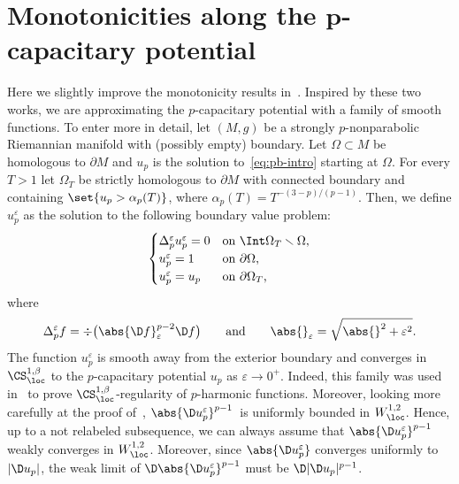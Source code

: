 \documentclass[10pt,a4paper]{amsart}
\numberwithin{equation}{section}
\newcounter{case}
\begin{document}
\appendix


\section[Monotonicities along the p-capacitary potential]{Monotonicities along the $\boldsymbol{p}$-capacitary potential}
\label{app:monotonicities}
Here we slightly improve the monotonicity results in~\cite{agostiniani_riemannianpenroseinequalitynonlinear_2022,chan_monotonicitygreenfunctions_2022}. Inspired by these two works, we are approximating the $p$-capacitary potential with a family of smooth functions. To enter more in detail, let $(M,g)$ be a strongly $p$-nonparabolic Riemannian manifold with (possibly empty) boundary. Let $\Omega \subset M$ be homologous to $\partial M$ and $u_p$ is the solution to~\eqref{eq:pb-intro} starting at $\Omega$. For every $T>1$ let $\Omega_T$ be strictly homologous to $\partial M$ with connected boundary and containing $\set{u_p>\alpha_p(T)}$, where $\alpha_p(T) = T^{-(3-p)/(p-1)}$. Then, we define $u_p^\varepsilon$ as the solution to the following boundary value problem:
\begin{equation}\label{eq:pb-intro-eps}
 \begin{cases}
 \Delta_{p}^\varepsilon u^\varepsilon_p = 0 &\text{on $\Int\Omega_T \smallsetminus \Omega $,}\\
 u_p^\varepsilon=1 & \text{on $\partial \Omega$,}\\
 u_p^\varepsilon=u_p & \text{on $\partial\Omega_T$,}
 \end{cases}
\end{equation}
where
\[
 \Delta_{p}^\varepsilon f = \div\big( \abs{ \D f}_\varepsilon^{p-2} \D f\big) \qquad \text{and} \qquad {\abs{}}_\varepsilon= \sqrt{ \abs{}^2 +\varepsilon^2}.
\]
The function $u^\varepsilon_p$ is smooth away from the exterior boundary and converges in $\CS^{1,\beta}_{\loc}$ to the $p$-capacitary potential $u_p$ as $\varepsilon \to 0^+$. Indeed, this family was used in~\cite{dibenedetto_alphalocalregularityweak_1983} to prove $\CS^{1,\beta}_{\loc}$-regularity of $p$-harmonic functions. Moreover, looking more carefully at the proof of~\cite[Lemma~2.1]{lou_singularsetslocalsolutions_2008}, $\abs{\D u^\varepsilon_p}^{p-1}$~is uniformly bounded in $W^{1,2}_{\loc}$. Hence, up to a not relabeled subsequence, we can always assume that $\abs{ \D u_p^\varepsilon}^{p-1}$ weakly converges in $W^{1,2}_{\loc}$. Moreover, since $\abs{ \D u_p^\varepsilon}$ converges uniformly to~$| \D u_p |$, the weak limit of $\D \abs{ \D u_p^\varepsilon}^{p-1}$ must be $\D | \D u_p |^{p-1}$.
\end{document}
